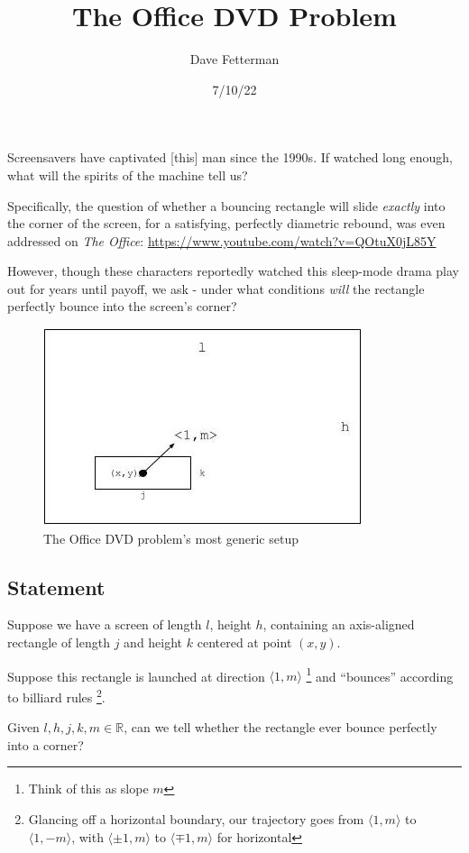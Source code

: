 \documentclass[11pt, oneside]{article} 	%
\title{The Office DVD Problem}
\author{Dave Fetterman}
\affil{Obviously Unemployed}
\date{7/10/22}
\begin{document}
\maketitle

Screensavers have captivated [this] man since the 1990s. If watched long enough, what will the spirits of the machine tell us?

Specifically, the question of whether a bouncing rectangle will slide \emph{exactly} into the corner of the screen, for a satisfying, perfectly diametric rebound, was even addressed on \emph{The Office}:
\url{https://www.youtube.com/watch?v=QOtuX0jL85Y}

However, though these characters reportedly watched this sleep-mode drama play out for years until payoff, we ask - under what conditions \emph{will} the rectangle perfectly bounce into the screen's corner?
 
\begin{figure}
\centering
\includegraphics[scale=.5]{setup}
\caption{The Office DVD problem's most generic setup}
\end{figure}

\subsection{Statement} 
Suppose we have a screen of length $l$, height $h$, containing an axis-aligned rectangle of length $j$ and height $k$ centered at point $(x, y)$.

Suppose this rectangle is launched at direction $\langle 1, m\rangle$ \footnote {Think of this as slope $m$} and ``bounces'' according to billiard rules \footnote{Glancing off a horizontal boundary, our trajectory goes from $\langle 1, m \rangle$ to $\langle 1, -m \rangle$, with $\langle \pm 1, m \rangle$ to $\langle \mp 1, m \rangle$ for horizontal}.

Given $l, h, j, k, m \in \mathbb{R}$, can we tell whether the rectangle ever bounce perfectly into a corner?  
\end{document}
